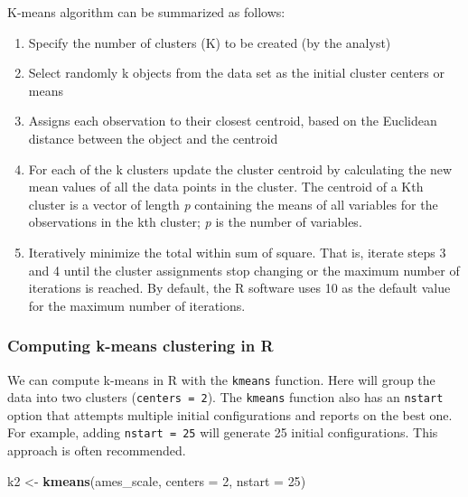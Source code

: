 \documentclass[]{book}
\newenvironment{Shaded}{\begin{snugshade}}{\end{snugshade}}
\newcommand{\DataTypeTok}[1]{\textcolor[rgb]{0.13,0.29,0.53}{#1}}
\newcommand{\DecValTok}[1]{\textcolor[rgb]{0.00,0.00,0.81}{#1}}
\newcommand{\KeywordTok}[1]{\textcolor[rgb]{0.13,0.29,0.53}{\textbf{#1}}}
\newcommand{\NormalTok}[1]{#1}
\newcommand{\StringTok}[1]{\textcolor[rgb]{0.31,0.60,0.02}{#1}}
\providecommand{\tightlist}{%
  \setlength{\itemsep}{0pt}\setlength{\parskip}{0pt}}
\theoremstyle{definition}
\theoremstyle{definition}
\theoremstyle{definition}
\theoremstyle{remark}
\begin{document}
K-means algorithm can be summarized as follows:

\begin{enumerate}
\def\labelenumi{\arabic{enumi}.}
\tightlist
\item
  Specify the number of clusters (K) to be created (by the analyst)
\item
  Select randomly k objects from the data set as the initial cluster
  centers or means
\item
  Assigns each observation to their closest centroid, based on the
  Euclidean distance between the object and the centroid
\item
  For each of the k clusters update the cluster centroid by calculating
  the new mean values of all the data points in the cluster. The
  centroid of a Kth cluster is a vector of length \emph{p} containing
  the means of all variables for the observations in the kth cluster;
  \emph{p} is the number of variables.
\item
  Iteratively minimize the total within sum of square. That is, iterate
  steps 3 and 4 until the cluster assignments stop changing or the
  maximum number of iterations is reached. By default, the R software
  uses 10 as the default value for the maximum number of iterations.
\end{enumerate}

\hypertarget{computing-k-means-clustering-in-r}{%
\subsubsection{Computing k-means clustering in
R}\label{computing-k-means-clustering-in-r}}

We can compute k-means in R with the \texttt{kmeans} function. Here will
group the data into two clusters (\texttt{centers\ =\ 2}). The
\texttt{kmeans} function also has an \texttt{nstart} option that
attempts multiple initial configurations and reports on the best one.
For example, adding \texttt{nstart\ =\ 25} will generate 25 initial
configurations. This approach is often recommended.

\begin{Shaded}
\begin{Highlighting}[]
\NormalTok{k2 <-}\StringTok{ }\KeywordTok{kmeans}\NormalTok{(ames_scale, }\DataTypeTok{centers =} \DecValTok{2}\NormalTok{, }\DataTypeTok{nstart =} \DecValTok{25}\NormalTok{)}
\end{Highlighting}
\end{Shaded}
\end{document}

